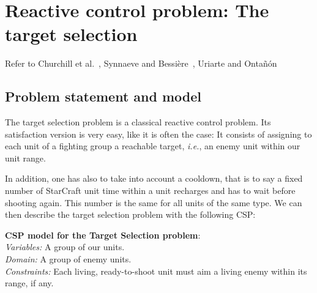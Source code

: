\documentclass[journal]{IEEEtran}
\newcommand{\csp}{\textsc{CSP}\xspace}
\newcommand{\ghost}{\textsc{GHOST}\xspace}
\newcommand{\ie}{\textit{i.e.}}
\newcommand{\modelcsp}[4]%
{ \begin{trivlist}
  \item[]%
    \textbf{CSP model for #1}:\\
    \textit{Variables:} #2\\
    \textit{Domain:} #3\\
    \textit{Constraints:} #4
  \end{trivlist}%
}
\begin{document}

\section{Reactive control problem: The target selection}\label{sec:target}

Refer to Churchill et al.~\cite{ChurchillSB12, ChurchillB12}, Synnaeve
and          Bessière~\cite{SynnaeveB11},         Uriarte          and
Onta{\~n}{\'o}n~\cite{UriarteO12}

\subsection{Problem statement and model}

The  target   selection  problem  is  a   classical  reactive  control
problem. Its satisfaction  version is very easy, like it  is often the
case: It  consists of  assigning to  each unit of  a fighting  group a
reachable target, \ie, an enemy unit within our unit range.

In addition, one has also to take  into account a cooldown, that is to
say a fixed number of StarCraft  unit time within a unit recharges and
has to  wait before shooting  again. This number  is the same  for all
units of  the same  type. We  can then  describe the  target selection
problem with the following \csp:
\modelcsp{the Target Selection problem}%
{A group of our units.}%
{A group of enemy units.}%
{Each living, ready-to-shoot  unit must aim a living  enemy within its
  range, if any.}
\end{document}
